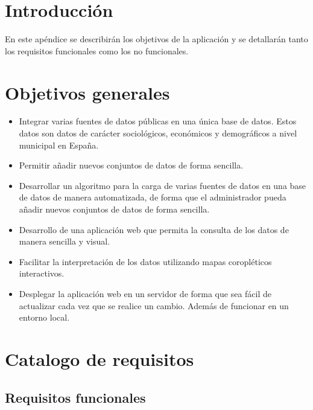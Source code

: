
\section{Introducción}

En este apéndice se describirán los objetivos de la aplicación y se detallarán tanto los requisitos funcionales como los no funcionales.

\section{Objetivos generales}

\begin{itemize}
	\item Integrar varias fuentes de datos públicas en una única base de datos. Estos datos son datos de carácter sociológicos, económicos y demográficos a nivel municipal en España.
	\item Permitir añadir nuevos conjuntos de datos de forma sencilla.
	\item Desarrollar un algoritmo para la carga de varias fuentes de datos en una base de datos de manera automatizada, de forma que el administrador pueda añadir nuevos conjuntos de datos de forma sencilla.
	\item Desarrollo de una aplicación web que permita la consulta de los datos de manera sencilla y visual.
	\item Facilitar la interpretación de los datos utilizando mapas coropléticos interactivos.
	\item Desplegar la aplicación web en un servidor de forma que sea fácil de actualizar cada vez que se realice un cambio. Además de funcionar en un entorno local.
\end{itemize}

\section{Catalogo de requisitos}

\subsection{Requisitos funcionales}

